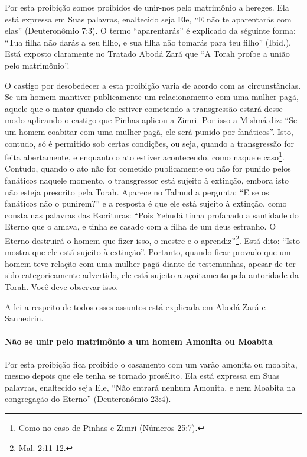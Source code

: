 Por esta proibição somos proibidos de unir-nos pelo matrimônio a
hereges. Ela está expressa em Suas palavras, enaltecido seja Ele, ``E
não te aparentarás com elas'' (Deuteronômio 7:3). O termo
``aparentarás'' é explicado da séguinte forma: ``Tua filha não darás a
seu filho, e sua filha não tomarás para teu filho'' (Ibid.). Está
exposto claramente no Tratado Abodá Zará que ``A Torah proíbe a união
pelo matrimônio''.

O castigo por desobedecer a esta proibição varia de acordo com as
circunstâncias. Se um homem mantiver publicamente um relacionamento com
uma mulher pagã, aquele que o matar quando ele estiver cometendo a
transgressão estará desse modo aplicando o castigo que Pinhas aplicou a
Zimri. Por isso a Mishná diz: ``Se um homem coabitar com uma mulher
pagã, ele será punido por fanáticos''. Isto, contudo, só é permitido
sob certas condições, ou seja, quando a transgressão for feita
abertamente, e enquanto o ato estiver acontecendo, como naquele
caso\footnote{Como no caso de Pinhas e Zimri (Números 25:7).}. Contudo, quando o ato não for cometido
publicamente ou não for punido pelos fanáticos naquele momento, o
transgressor está sujeito à extinção, embora isto não esteja prescrito
pela Torah. Aparece no Talmud a pergunta: ``E se os fanáticos não o
punirem?'' e a resposta é que ele está sujeito à extinção, como consta
nas palavras das Escrituras: ``Pois Yehudá tinha profanado a santidade
do Eterno que o amava, e tinha se casado com a filha de um deus
estranho. O Eterno destruirá o homem que fizer isso, o mestre e o
aprendiz''\footnote{Mal. 2:11-12.}. Está dito: ``Isto mostra que ele está
sujeito à extinção''. Portanto, quando ficar provado que um homem teve
relação com uma mulher pagã diante de testemunhas, apesar de ter sido
categoricamente advertido, ele está sujeito a açoitamento pela
autoridade da Torah. Você deve observar isso.

A lei a respeito de todos esses assuntos está explicada em Abodá Zará e Sanhedrin.

\paragraph{Não se unir pelo matrimônio a um homem Amonita ou Moabita}

Por esta proibição fica proibido o casamento com um varão amonita ou
moabita, mesmo depois que ele tenha se tornado prosélito. Ela está
expressa em Suas palavras, enaltecido seja Ele, ``Não entrará nenhum
Amonita, e nem Moabita na congregação do Eterno'' (Deuteronômio 23:4).


